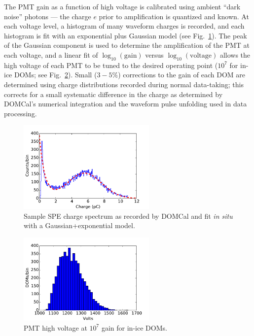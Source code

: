 The PMT gain as a function of high voltage is calibrated using ambient
``dark noise'' photons --- the charge $e$ prior to amplification is quantized
and known.  At each voltage level, a histogram of many waveform charges is recorded,
and each histogram is fit with an exponential plus Gaussian model (see
Fig.~\ref{fig:domcal_hvfit}).  The peak of the Gaussian component is used to
determine the amplification of the PMT at each voltage, and a linear fit
of $\log_{10}(\mathrm{gain})$ versus $\log_{10}(\mathrm{voltage})$ allows
the high voltage of each PMT to be tuned to the desired operating point ($10^7$
for in-ice DOMs; see Fig.~\ref{fig:domcal_hv_settings}).  Small ($3-5\%$)
corrections to the gain of each DOM are determined using charge
distributions recorded during normal data-taking; this corrects for a small
systematic difference in the charge as determined by DOMCal's numerical
integration and the waveform pulse unfolding used in data processing.

\begin{figure}[!h]
 \centering
 \includegraphics[width=0.6\textwidth]{graphics/dom/domcal/hvfit.pdf}
 \caption{Sample SPE charge spectrum as recorded by DOMCal and fit
   \textit{in situ} with a Gaussian+exponential model.} 
 \label{fig:domcal_hvfit}
\end{figure}

\begin{figure}[!h]
 \centering
 \includegraphics[width=0.6\textwidth]{graphics/dom/domcal/inice_hv_2016.pdf}
 \caption{PMT high voltage at $10^7$ gain for in-ice DOMs.}
 \label{fig:domcal_hv_settings}
\end{figure}

